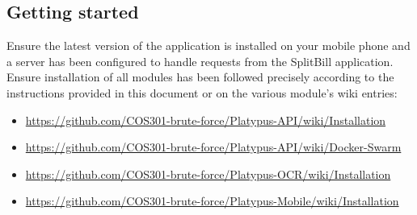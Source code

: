 \documentclass[12pt,a4paper]{article}
\begin{document}
    
\subsection{Getting started}
Ensure the latest version of the application is installed on your mobile phone and a server has been configured to handle requests from the SplitBill application. Ensure installation of all modules has been followed precisely according to the instructions provided in this document or on the various module's wiki entries: 
\begin{itemize}
\item \url{https://github.com/COS301-brute-force/Platypus-API/wiki/Installation}
\item \url{https://github.com/COS301-brute-force/Platypus-API/wiki/Docker-Swarm} 
\item \url{https://github.com/COS301-brute-force/Platypus-OCR/wiki/Installation} 
\item \url{https://github.com/COS301-brute-force/Platypus-Mobile/wiki/Installation}
\end{itemize}
\end{document}
